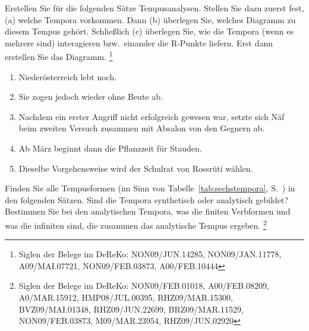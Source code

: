 \begin{sloppypar}

\Uebung \label{u91} Erstellen Sie für die folgenden Sätze Tempusanalysen.
Stellen Sie dazu zuerst fest, (a) welche Tempora vorkommen.
Dann (b) überlegen Sie, welches Diagramm zu diesem Tempus gehört.
Schließlich (c) überlegen Sie, wie die Tempora (wenn es mehrere sind) interagieren bzw.\ einander die R-Punkte liefern.
Erst dann erstellen Sie das Diagramm.
\footnote{Siglen der Belege im DeReKo: NON09\slash JUN.14285, NON09\slash JAN.11778, A09\slash MAI.07721, NON09\slash FEB.03873, A00\slash FEB.10444}

\begin{enumerate}\Lf
  \item Niederösterreich lebt noch.
  \item Sie zogen jedoch wieder ohne Beute ab.
  \item Nachdem ein erster Angriff nicht erfolgreich gewesen war, setzte sich Näf beim zweiten Versuch zusammen mit Absalon von den Gegnern ab.
  \item Ab März beginnt dann die Pflanzzeit für Stauden.
  \item Dieselbe Vorgehensweise wird der Schulrat von Rossrüti wählen.
\end{enumerate}

\Uebung \label{u92} Finden Sie alle Tempusformen (im Sinn von Tabelle~\ref{tab:sechstempora}, S.~\pageref{tab:sechstempora}) in den folgenden Sätzen.
Sind die Tempora synthetisch oder analytisch gebildet?
Bestimmen Sie bei den analytischen Tempora, was die finiten Verbformen und was die infiniten sind, die zusammen das analytische Tempus ergeben.%
\footnote{Siglen der Belege im DeReKo: NON09\slash FEB.01018, A00\slash FEB.08209, A0\slash MAR.15912, HMP08\slash JUL.00395, RHZ09\slash MAR.15300, BVZ09\slash MAI.01348, RHZ09\slash JUN.22699, BRZ09\slash MAR.11529, NON09\slash FEB.03873, M09\slash MAR.23954, RHZ09\slash JUN.02920}


\end{sloppypar}

